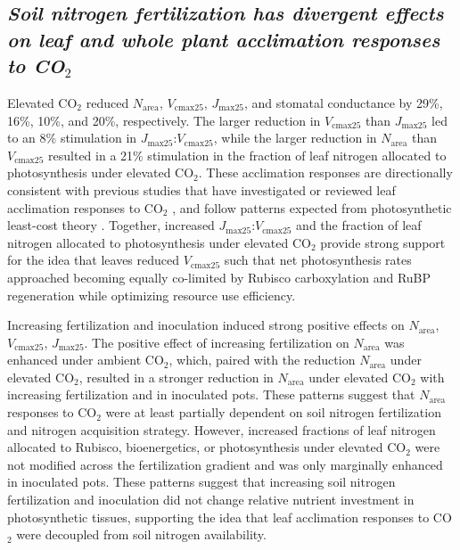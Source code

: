 \begin{singlespace}
    \subsection{\textit{Soil nitrogen fertilization has divergent effects on leaf and whole plant acclimation responses to CO$_2$}}
\end{singlespace}
\noindent Elevated CO$_2$ reduced $N_\mathrm{area}$, $V_\mathrm{cmax25}$, $J_\mathrm{max25}$, and stomatal conductance by 29\%, 16\%, 10\%, and 20\%, respectively. The larger reduction in $V_\mathrm{cmax25}$ than $J_\mathrm{max25}$ led to an 8\% stimulation in $J_\mathrm{max25}$:$V_\mathrm{cmax25}$, while the larger reduction in $N_\mathrm{area}$ than $V_\mathrm{cmax25}$ resulted in a 21\% stimulation in the fraction of leaf nitrogen allocated to photosynthesis under elevated CO$_2$. These acclimation responses are directionally consistent with previous studies that have investigated or reviewed leaf acclimation responses to CO$_2$ , and follow patterns expected from photosynthetic least-cost theory . Together, increased $J_\mathrm{max25}$:$V_\mathrm{cmax25}$ and the fraction of leaf nitrogen allocated to photosynthesis under elevated CO$_2$ provide strong support for the idea that leaves reduced $V_\mathrm{cmax25}$ such that net photosynthesis rates approached becoming equally co-limited by Rubisco carboxylation and RuBP regeneration  while optimizing resource use efficiency.

Increasing fertilization and inoculation induced strong positive effects on $N_\mathrm{area}$, $V_\mathrm{cmax25}$, $J_\mathrm{max25}$. The positive effect of increasing fertilization on $N_\mathrm{area}$ was enhanced under ambient CO$_2$, which, paired with the  reduction $N_\mathrm{area}$ under elevated CO$_2$, resulted in a stronger reduction in $N_\mathrm{area}$ under elevated CO$_2$ with increasing fertilization and in inoculated pots. These patterns suggest that $N_\mathrm{area}$ responses to CO$_2$ were at least partially dependent on soil nitrogen fertilization and nitrogen acquisition strategy. However, increased fractions of leaf nitrogen allocated to Rubisco, bioenergetics, or photosynthesis under elevated CO$_2$ were not modified across the fertilization gradient and was only marginally enhanced in inoculated pots. These patterns suggest that increasing soil nitrogen fertilization and inoculation did not change relative nutrient investment in photosynthetic tissues, supporting the idea that leaf acclimation responses to CO$_2$ were decoupled from soil nitrogen availability.


